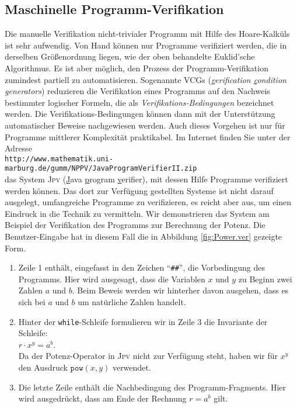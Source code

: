 \subsection{Maschinelle Programm-Verifikation}
Die manuelle Verifikation nicht-trivialer Programm mit Hilfe des Hoare-Kalk\"uls ist sehr
aufwendig.  Von Hand k\"onnen nur Programme verifiziert werden, die in derselben
Gr\"o{\ss}enordnung liegen, wie der oben behandelte Euklid'sche Algorithmus.  Es ist aber
m\"oglich, den Prozess der Programm-Verifikation zumindest partiell zu automatisieren.
Sogenannte VCGs (\emph{\underline{v}erification \underline{c}ondition
  \underline{g}enerators}) reduzieren die Verifikation eines Programms auf den Nachweis
bestimmter logischer Formeln, die als \emph{Verifikations-Bedingungen} bezeichnet werden.
Die Verifikations-Bedingungen k\"onnen dann mit der Unterst\"utzung automatischer Beweise
nachgewiesen werden.  Auch dieses Vorgehen ist nur f\"ur Programme mittlerer Komplexit\"at
praktikabel.  Im Internet finden Sie unter der Adresse
\\[0.2cm]
\hspace*{1.3cm}
\texttt{http://www.mathematik.uni-marburg.de/gumm/NPPV/JavaProgramVerifierII.zip}
\\[0.2cm]
das System \textsc{Jpv} (\underline{J}ava \underline{p}rogram \underline{v}erifier), 
mit dessen Hilfe Programme verifiziert werden k\"onnen.  Das dort zur Verf\"ugung
gestellten Systeme ist nicht darauf ausgelegt, umfangreiche Programme zu verifizieren, es
reicht aber aus, um einen Eindruck in die Technik zu vermitteln.  Wir demonstrieren das
System am Beispiel der Verifikation des Programms zur Berechnung der Potenz.  Die
Benutzer-Eingabe hat in diesem Fall die in Abbildung \ref{fig:Power.ver} gezeigte Form.
\begin{enumerate}
\item Zeile 1 enth\"alt, eingefasst in den Zeichen ``\texttt{\#\#}'', die Vorbedingung
      des Programms. Hier wird ausgesagt, dass die Variablen $x$ und $y$ zu Beginn
      zwei Zahlen $a$ und $b$.  Beim Beweis werden wir hinterher davon ausgehen, dass
      es sich bei $a$ und $b$ um nat\"urliche Zahlen handelt.
\item Hinter der \texttt{while}-Schleife formulieren wir in Zeile 3 die Invariante der Schleife:
      \\[0.2cm]
      \hspace*{1.3cm}
      $r \cdot x^y = a^b$.
      \\[0.2cm]
      Da der Potenz-Operator in \textsc{Jpv} nicht zur Verf\"ugung steht, haben wir f\"ur
      $x^y$ den Ausdruck $\texttt{pow}(x,y)$ verwendet.
\item Die letzte Zeile enth\"alt die Nachbedingung des Programm-Fragments.  Hier wird
      ausgedr\"uckt, dass am Ende der Rechnung $r = a^b$ gilt.
\end{enumerate}


